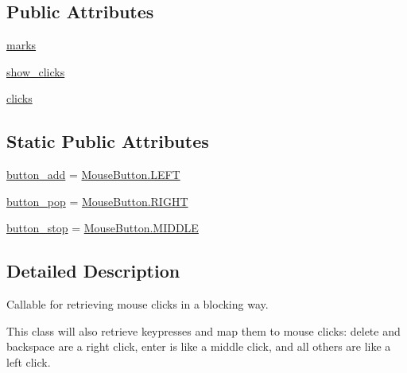 \subsection*{Public Attributes}
\begin{DoxyCompactItemize}
\item 
\hyperlink{classmatplotlib_1_1blocking__input_1_1BlockingMouseInput_a86f3895e0ae4d12d5f207faa50352cb0}{marks}
\item 
\hyperlink{classmatplotlib_1_1blocking__input_1_1BlockingMouseInput_a2c50d305b7f13b41de5df7530c4ac0a1}{show\+\_\+clicks}
\item 
\hyperlink{classmatplotlib_1_1blocking__input_1_1BlockingMouseInput_acee86a1d94cbcf4419f8e5710b391cc8}{clicks}
\end{DoxyCompactItemize}
\subsection*{Static Public Attributes}
\begin{DoxyCompactItemize}
\item 
\hyperlink{classmatplotlib_1_1blocking__input_1_1BlockingMouseInput_a88eb3008257aa4a40c85f2f5051760a8}{button\+\_\+add} = \hyperlink{classmatplotlib_1_1backend__bases_1_1MouseButton_ae8e233d820706cbadfe957ae465eeb95}{Mouse\+Button.\+L\+E\+FT}
\item 
\hyperlink{classmatplotlib_1_1blocking__input_1_1BlockingMouseInput_aa6adf536f33d4535f119999e2be5d019}{button\+\_\+pop} = \hyperlink{classmatplotlib_1_1backend__bases_1_1MouseButton_a978a5d3296f60f59521a4e671cada7c8}{Mouse\+Button.\+R\+I\+G\+HT}
\item 
\hyperlink{classmatplotlib_1_1blocking__input_1_1BlockingMouseInput_a51393bf648a8c1c340ca1040e820190a}{button\+\_\+stop} = \hyperlink{classmatplotlib_1_1backend__bases_1_1MouseButton_ae501ff34ab8b37895cebc5046cc651a7}{Mouse\+Button.\+M\+I\+D\+D\+LE}
\end{DoxyCompactItemize}


\subsection{Detailed Description}
\begin{DoxyVerb}Callable for retrieving mouse clicks in a blocking way.

This class will also retrieve keypresses and map them to mouse clicks:
delete and backspace are a right click, enter is like a middle click,
and all others are like a left click.
\end{DoxyVerb}
 

